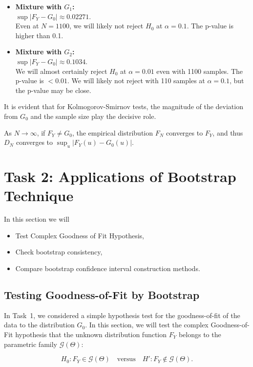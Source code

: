 \documentclass{article}
\begin{document}
\begin{itemize}
    \item \textbf{Mixture with \(G_1\):}\\
    \(\sup|F_Y-G_0|\approx 0.02271\).\\  
    Even at \(N=1100\), we will likely not reject \(H_0\) at \(\alpha=0.1\). The p-value is higher than 0.1.
    \item \textbf{Mixture with \(G_2\):}\\
    \(\sup|F_Y-G_0|\approx 0.1034\).\\
    We will almost certainly reject \(H_0\) at \(\alpha=0.01\) even with 1100 samples. The p-value is \(<0.01\). We will likely not reject with 110 samples at \(\alpha=0.1\), but the p-value may be close.
\end{itemize}

It is evident that for Kolmogorov-Smirnov tests, the magnitude of the deviation from \(G_0\) and the sample size play the decisive role.

As \(N \to \infty\), if \(F_Y \neq G_0\), the empirical distribution \(F_N\) converges to \(F_Y\), and thus \(D_N\) converges to \(\sup_u |F_Y(u)-G_0(u)|\).

\section{Task 2: Applications of Bootstrap Technique}

In this section we will

\begin{itemize}
    \item Test Complex Goodness of Fit Hypothesis,
    \item Check bootstrap consistency,
    \item Compare bootstrap confidence interval construction methods.
\end{itemize}

\subsection{Testing Goodness-of-Fit by Bootstrap}

In Task~1, we considered a simple hypothesis test for the goodness-of-fit of the data to the distribution \(G_0\). In this section, we will test the complex Goodness-of-Fit hypothesis that the unknown distribution function \(F_Y\) belongs to the parametric family \(\mathcal{G}(\Theta)\):

\[
  H_0: F_Y \in \mathcal{G}(\Theta)
  \quad\text{versus}\quad
  H': F_Y \notin \mathcal{G}(\Theta).
\]
\end{document}
